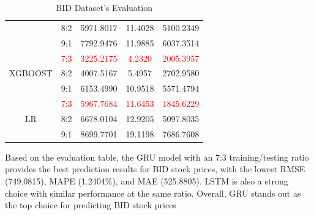\documentclass{ieeeojies}
\begin{document}
\begin{table}[H]
\begin{tabular}{|c|c|c|c|c|}
         & 8:2 & 5971.8017 & 11.4028 & 5100.2349 \\ 
         & 9:1 & 7792.9476 & 11.9885 & 6037.3514 \\
         \hline
         \multirow{3}{*}{XGBOOST} 
         & \textcolor{red}{7:3} & \textcolor{red}{3225.2175} & \textcolor{red}{4.2320} & \textcolor{red}{2005.3957} \\ 
         & 8:2 & 4007.5167 & 5.4957 & 2702.9580 \\ 
         & 9:1 & 6153.4990 & 10.9518 & 5571.4794 \\
         \hline
         \multirow{3}{*}{LR} 
         & \textcolor{red}{7:3} & \textcolor{red}{5967.7684} & \textcolor{red}{11.6453} & \textcolor{red}{1845.6229} \\
         & 8:2 & 6678.0104 & 12.9205 & 5097.8035 \\ 
         & 9:1 & 8699.7701 & 19.1198 & 7686.7608 \\
         \hline
    \end{tabular}
    \caption{BID Dataset's Evaluation}
    \label{vcbdataset}
\end{table}



Based on the evaluation table, the GRU model with an 7:3 training/testing ratio provides the best prediction results for BID stock prices, with the lowest RMSE (749.0815), MAPE (1.2404\%), and MAE (525.8805). LSTM is also a strong choice with similar performance at the same ratio. Overall, GRU stands out as the top choice for predicting BID stock prices
\end{document}
